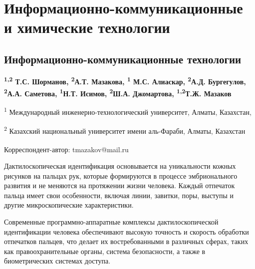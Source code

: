 \newpage
\let\cleardoublepage\clearpage
\part{Информационно-коммуникационные и химические технологии}
\chapter{Информационно-коммуникационные технологии}

\begin{articleheader}

{\bfseries \textsuperscript{1,2}
Т.С. Шорманов, \textsuperscript{2}А.Т.  Мазакова, \textsuperscript{1}
М.С. Алиаскар, \textsuperscript{2}А.Д.
Бургегулов, \textsuperscript{2}А.А. Саметова, \linebreak \textsuperscript{1}Н.Т. Исимов, \textsuperscript{2}Ш.А.
Джомартова, \textsuperscript{1,2}Т.Ж. Мазаков\textsuperscript{\envelope }}
\end{articleheader}

\begin{affiliation}
\textsuperscript{1} Международный инженерно-технологический университет,
Алматы, Казахстан,

\textsuperscript{2} Казахский национальный университет имени аль-Фараби,
Алматы, Казахстан

\raggedright {\bfseries \textsuperscript{\envelope }}Корреспондент-автор: tmazakov@mail.ru
\end{affiliation}

Дактилоскопическая идентификация основывается на уникальности кожных
рисунков на пальцах рук, которые формируются в процессе эмбрионального
развития и не меняются на протяжении жизни человека. Каждый отпечаток
пальца имеет свои особенности, включая линии, завитки, поры, выступы и
другие микроскопические характеристики.

Современные программно-аппаратные комплексы дактилоскопической
идентификации человека обеспечивают высокую точность и скорость
обработки отпечатков пальцев, что делает их востребованными в различных
сферах, таких как правоохранительные органы, система безопасности, а
также в биометрических системах доступа.

